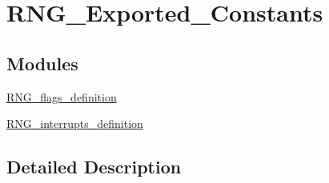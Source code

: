 \hypertarget{group___r_n_g___exported___constants}{}\section{R\+N\+G\+\_\+\+Exported\+\_\+\+Constants}
\label{group___r_n_g___exported___constants}
\subsection*{Modules}
\begin{DoxyCompactItemize}
\item 
\hyperlink{group___r_n_g__flags__definition}{R\+N\+G\+\_\+flags\+\_\+definition}
\item 
\hyperlink{group___r_n_g__interrupts__definition}{R\+N\+G\+\_\+interrupts\+\_\+definition}
\end{DoxyCompactItemize}


\subsection{Detailed Description}
